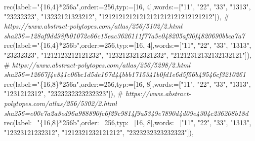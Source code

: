 \documentclass[
  10pt,
  letterpaper,
]{article}
\newenvironment{Shaded}{}{}
\newcommand{\CommentTok}[1]{\textcolor[rgb]{0.38,0.63,0.69}{\textit{#1}}}
\newcommand{\ExtensionTok}[1]{#1}
\newcommand{\FloatTok}[1]{\textcolor[rgb]{0.25,0.63,0.44}{#1}}
\newcommand{\NormalTok}[1]{#1}
\newcommand{\OperatorTok}[1]{\textcolor[rgb]{0.40,0.40,0.40}{#1}}
\newcommand{\StringTok}[1]{\textcolor[rgb]{0.25,0.44,0.63}{#1}}
\newcommand{\VariableTok}[1]{\textcolor[rgb]{0.10,0.09,0.49}{#1}}
\begin{document}
\begin{Shaded}
\begin{Highlighting}[]
\ExtensionTok{rec}\NormalTok{(}\VariableTok{label}\OperatorTok{:=}\StringTok{"\{16,4\}*256a"}\OperatorTok{,}\VariableTok{order}\OperatorTok{:=}\FloatTok{256}\OperatorTok{,}\VariableTok{typ}\OperatorTok{:=}\NormalTok{[}\FloatTok{16}\OperatorTok{,} \FloatTok{4}\NormalTok{]}\OperatorTok{,}\VariableTok{words}\OperatorTok{:=}\NormalTok{[}\StringTok{"11"}\OperatorTok{,} \StringTok{"22"}\OperatorTok{,} \StringTok{"33"}\OperatorTok{,} \StringTok{"1313"}\OperatorTok{,} \StringTok{"23232323"}\OperatorTok{,} \StringTok{"13232121323212"}\OperatorTok{,} \StringTok{"12121212121212121212121212121212"}\NormalTok{])}\OperatorTok{,}
\NormalTok{\#}\CommentTok{ https://www.abstract{-}polytopes.com/atlas/256/5102/2.html sha256=128af9dd98fb01072c66c15eac3626111f77a5e048205af30f4820690bbca7a7}
\ExtensionTok{rec}\NormalTok{(}\VariableTok{label}\OperatorTok{:=}\StringTok{"\{16,4\}*256b"}\OperatorTok{,}\VariableTok{order}\OperatorTok{:=}\FloatTok{256}\OperatorTok{,}\VariableTok{typ}\OperatorTok{:=}\NormalTok{[}\FloatTok{16}\OperatorTok{,} \FloatTok{4}\NormalTok{]}\OperatorTok{,}\VariableTok{words}\OperatorTok{:=}\NormalTok{[}\StringTok{"11"}\OperatorTok{,} \StringTok{"22"}\OperatorTok{,} \StringTok{"33"}\OperatorTok{,} \StringTok{"1313"}\OperatorTok{,} \StringTok{"23232323"}\OperatorTok{,} \StringTok{"1212123212121232"}\OperatorTok{,} \StringTok{"1232123212321232"}\OperatorTok{,} \StringTok{"21212312132132132121"}\NormalTok{])}\OperatorTok{,}
\NormalTok{\#}\CommentTok{ https://www.abstract{-}polytopes.com/atlas/256/5298/2.html sha256=12667f4e841c06bc1d5de167d44bbb1715341b0fd1e6d5f56b49546cf3210261}
\ExtensionTok{rec}\NormalTok{(}\VariableTok{label}\OperatorTok{:=}\StringTok{"\{16,8\}*256a"}\OperatorTok{,}\VariableTok{order}\OperatorTok{:=}\FloatTok{256}\OperatorTok{,}\VariableTok{typ}\OperatorTok{:=}\NormalTok{[}\FloatTok{16}\OperatorTok{,} \FloatTok{8}\NormalTok{]}\OperatorTok{,}\VariableTok{words}\OperatorTok{:=}\NormalTok{[}\StringTok{"11"}\OperatorTok{,} \StringTok{"22"}\OperatorTok{,} \StringTok{"33"}\OperatorTok{,} \StringTok{"1313"}\OperatorTok{,} \StringTok{"1231212312"}\OperatorTok{,} \StringTok{"2323232323232323"}\NormalTok{])}\OperatorTok{,}
\NormalTok{\#}\CommentTok{ https://www.abstract{-}polytopes.com/atlas/256/5302/2.html sha256=e00e7a2a8ed96a988890fc6f29c9814f9a5349e7890d4d09e4304c236208b18d}
\ExtensionTok{rec}\NormalTok{(}\VariableTok{label}\OperatorTok{:=}\StringTok{"\{16,8\}*256b"}\OperatorTok{,}\VariableTok{order}\OperatorTok{:=}\FloatTok{256}\OperatorTok{,}\VariableTok{typ}\OperatorTok{:=}\NormalTok{[}\FloatTok{16}\OperatorTok{,} \FloatTok{8}\NormalTok{]}\OperatorTok{,}\VariableTok{words}\OperatorTok{:=}\NormalTok{[}\StringTok{"11"}\OperatorTok{,} \StringTok{"22"}\OperatorTok{,} \StringTok{"33"}\OperatorTok{,} \StringTok{"1313"}\OperatorTok{,} \StringTok{"12323121232312"}\OperatorTok{,} \StringTok{"1212321232121212"}\OperatorTok{,} \StringTok{"2323232323232323"}\NormalTok{])}\OperatorTok{,}

\end{Highlighting}
\end{Shaded}
\end{document}
